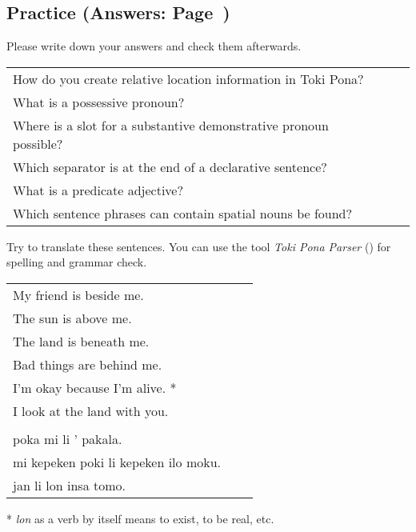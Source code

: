 %
\newpage
\subsection*{Practice (Answers: Page~\pageref{'other_prepositions'})}
%
Please write down your answers and check them afterwards. 

\begin{supertabular}{p{5,5cm}|ll}
How do you create relative location information in Toki Pona? &&  \\ %
What is a possessive pronoun? && \\ %
Where is a slot for a substantive demonstrative pronoun possible? &&   \\ %
Which separator is at the end of a declarative sentence? &&  \\ %
What is a predicate adjective? &&  \\ %
Which sentence phrases can contain spatial nouns be found? &&   \\ %
\end{supertabular}

Try to translate these sentences. 
You can use the tool \textit{Toki Pona Parser} (\cite{www:rowa:02}) for spelling and grammar check. 

\begin{supertabular}{p{5,5cm}|ll}
My friend is beside me. && \\ %
The sun is above me. && \\ %
The land is beneath me. && \\ %
Bad things are behind me. && \\ %
I'm okay because I'm alive. * && \\ %
I look at the land with you. && \\ %
 && \\ %
poka mi li ' pakala. && \\ %
mi kepeken poki li kepeken ilo moku. && \\ %
jan li lon insa tomo. && \\ %
\end{supertabular} 

* \textit{lon} as a verb by itself means to exist, to be real, etc. 
% 
